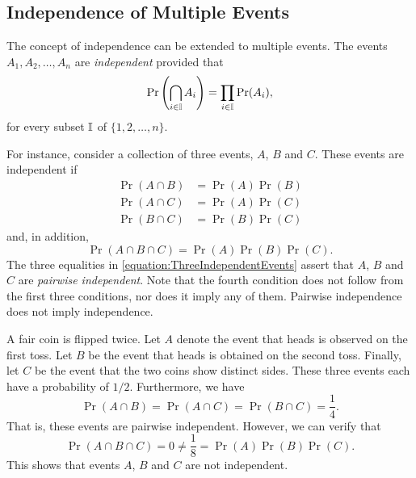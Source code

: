 \subsection{Independence of Multiple Events}

The concept of independence can be extended to multiple events.
The events $A_1, A_2, \ldots, A_n$ are \emph{independent} provided that 
\begin{equation} \label{equation:IndependenceMultipleEvents}
\Pr \left( \bigcap_{i \in \mathbb{I}} A_i \right)
= \prod_{i \in \mathbb{I}} \Pr (A_i) ,
\end{equation}
for every subset $\mathbb{I}$ of $\{1, 2, \ldots, n\}$.

For instance, consider a collection of three events, $A$, $B$ and $C$.
These events are independent if
\begin{equation} \label{equation:ThreeIndependentEvents}
\begin{split}
\Pr (A \cap B) &= \Pr (A) \Pr (B) \\
\Pr (A \cap C) &= \Pr (A) \Pr (C) \\
\Pr (B \cap C) &= \Pr (B) \Pr (C)
\end{split}
\end{equation}
and, in addition,
\begin{equation*}
\Pr (A \cap B \cap C) = \Pr (A) \Pr (B) \Pr(C) .
\end{equation*}
The three equalities in \eqref{equation:ThreeIndependentEvents} assert that $A$, $B$ and $C$ are \emph{pairwise independent}.
Note that the fourth condition does not follow from the first three conditions, nor does it imply any of them.
Pairwise independence does not imply independence.

\begin{example}
A fair coin is flipped twice.
Let $A$ denote the event that heads is observed on the first toss.
Let $B$ be the event that heads is obtained on the second toss.
Finally, let $C$ be the event that the two coins show distinct sides.
These three events each have a probability of $1/2$.
Furthermore, we have
\begin{equation*}
\Pr (A \cap B) = \Pr (A \cap C) = \Pr (B \cap C) = \frac{1}{4} .
\end{equation*}
That is, these events are pairwise independent.
However, we can verify that
\begin{equation*}
\Pr (A \cap B \cap C) = 0 \neq \frac{1}{8} = \Pr (A) \Pr (B) \Pr (C) .
\end{equation*}
This shows that events $A$, $B$ and $C$ are not independent.
\end{example}

